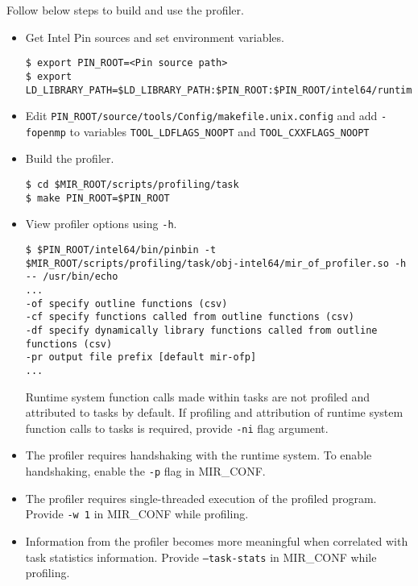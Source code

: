 \documentclass[11pt,a4paper]{article}
\begin{document}
Follow below steps to build and use the profiler.

\begin{itemize}
\item Get Intel Pin sources and set environment variables.

\begin{lstlisting}[style=MyInputStyle]
$ export PIN_ROOT=<Pin source path>
$ export LD_LIBRARY_PATH=$LD_LIBRARY_PATH:$PIN_ROOT:$PIN_ROOT/intel64/runtime
\end{lstlisting}

\item Edit \texttt{PIN\_ROOT/source/tools/Config/makefile.unix.config} and add \texttt{-fopenmp} to variables \texttt{TOOL\_LDFLAGS\_NOOPT}  and \texttt{TOOL\_CXXFLAGS\_NOOPT}

\item Build the profiler.

\begin{lstlisting}[style=MyInputStyle]
$ cd $MIR_ROOT/scripts/profiling/task
$ make PIN_ROOT=$PIN_ROOT
\end{lstlisting}

\item View profiler options using \texttt{-h}.

\begin{lstlisting}[style=MyInputStyle]
$ $PIN_ROOT/intel64/bin/pinbin -t $MIR_ROOT/scripts/profiling/task/obj-intel64/mir_of_profiler.so -h -- /usr/bin/echo
...
-of specify outline functions (csv)
-cf specify functions called from outline functions (csv)
-df specify dynamically library functions called from outline functions (csv)
-pr output file prefix [default mir-ofp]
...
\end{lstlisting}

Runtime system function calls made within tasks are not profiled and attributed to tasks by default.
If profiling and attribution of runtime system function calls to tasks is required, provide \texttt{-ni} flag argument.

\item The profiler requires handshaking with the runtime system. To enable handshaking, enable the \texttt{-p} flag in MIR\_CONF.

\item The profiler requires single-threaded execution of the profiled program. Provide \texttt{-w 1} in MIR\_CONF while profiling.

\item Information from the profiler becomes more meaningful when correlated with task statistics information. Provide \texttt{--task-stats} in MIR\_CONF while profiling.


\end{itemize}
\end{document}
